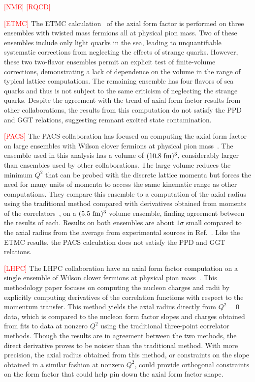 
\textcolor{red}{[NME]}
\textcolor{red}{[RQCD]}

\textcolor{red}{[ETMC]}
The ETMC calculation~\cite{Alexandrou:2020okk} of the axial form factor
 is performed on three ensembles with twisted mass fermions all at physical pion mass.
Two of these ensembles include only light quarks in the sea,
 leading to unquantifiable systematic corrections from
 neglecting the effects of strange quarks.
However, these two two-flavor ensembles permit an explicit test of finite-volume corrections,
 demonstrating a lack of dependence on the volume in the range of typical lattice computations.
The remaining ensemble has four flavors of sea quarks and thus is not subject
 to the same criticism of neglecting the strange quarks.
Despite the agreement with the trend of axial form factor results from other collaborations,
 the results from this computation do not satisfy the PPD and GGT relations,
 suggesting remnant excited state contamination.

\textcolor{red}{[PACS]}
The PACS collaboration has focused on computing the axial form factor
 on large ensembles with Wilson clover fermions at
 physical pion mass~\cite{Ishikawa:2018rew,Shintani:2018ozy}.
The ensemble used in this analysis has a volume of $(10.8~{\rm fm})^3$,
 considerably larger than ensembles used by other collaborations.
The large volume reduces the minimum $Q^2$ that can be probed
 with the discrete lattice momenta but forces the need for many units of momenta
 to access the same kinematic range as other computations.
They compare this ensemble to a computation of the axial radius using
 the traditional method compared with derivatives obtained from
 moments of the correlators~\cite{Aglietti:1994nx},
 on a $(5.5~{\rm fm})^3$ volume ensemble, finding agreement between the results of each.
Results on both ensembles are about $1\sigma$ small compared to the axial radius
 from the average from experimental sources in Ref.~\cite{Hill:2017wgb}.
Like the ETMC results, the PACS calculation does not satisfy the PPD and GGT relations.

\textcolor{red}{[LHPC]}
The LHPC collaboration have an axial form factor computation on a
 single ensemble of Wilson clover fermions at physical pion mass~\cite{Hasan:2017wwt}.
This methodology paper focuses on computing the nucleon charges
 and radii by explicitly computing derivatives of the correlation functions
 with respect to the momentum transfer.
This method yields the axial radius directly from $Q^2=0$ data,
 which is compared to the nucleon form factor slopes and charges obtained from
 fits to data at nonzero $Q^2$ using the traditional three-point correlator methods.
Though the results are in agreement between the two methods,
 the direct derivative proves to be noisier than the traditional method.
With more precision, the axial radius obtained from this method,
 or constraints on the slope obtained in a similar fashion at nonzero $Q^2$,
 could provide orthogonal constraints on the form factor that could
 help pin down the axial form factor shape.


